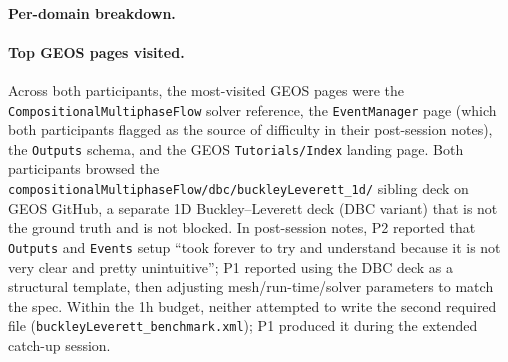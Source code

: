 \documentclass{article}
\begin{document}
\paragraph{Per-domain breakdown.}

\begin{table}[h]
  \caption{Browser-navigation breakdown during the one-hour authoring session, per participant. ``GEOS docs'' = visits to the GEOS Sphinx documentation host (\texttt{geosx-geosx.readthedocs-hosted.com}) including all subpages. ``GEOS GitHub'' = visits to \texttt{github.com/GEOS-DEV/GEOS}. ``Other'' = unrelated tabs that remained open during the session. No participant visited any LLM chatbot, Stack Overflow, or general scientific-paper site.}
  \label{tab:human-browser}
  \centering
  \small
\end{table}

\paragraph{Top GEOS pages visited.} Across both participants, the most-visited GEOS pages were the \texttt{CompositionalMultiphaseFlow} solver reference, the \texttt{EventManager} page (which both participants flagged as the source of difficulty in their post-session notes), the \texttt{Outputs} schema, and the GEOS \texttt{Tutorials/Index} landing page. Both participants browsed the \texttt{compositionalMultiphaseFlow/dbc/buckleyLeverett\_1d/} sibling deck on GEOS GitHub, a separate 1D Buckley--Leverett deck (DBC variant) that is not the ground truth and is not blocked. In post-session notes, P2 reported that \texttt{Outputs} and \texttt{Events} setup ``took forever to try and understand because it is not very clear and pretty unintuitive''; P1 reported using the DBC deck as a structural template, then adjusting mesh/run-time/solver parameters to match the spec. Within the 1h budget, neither attempted to write the second required file (\texttt{buckleyLeverett\_benchmark.xml}); P1 produced it during the extended catch-up session.
\end{document}
